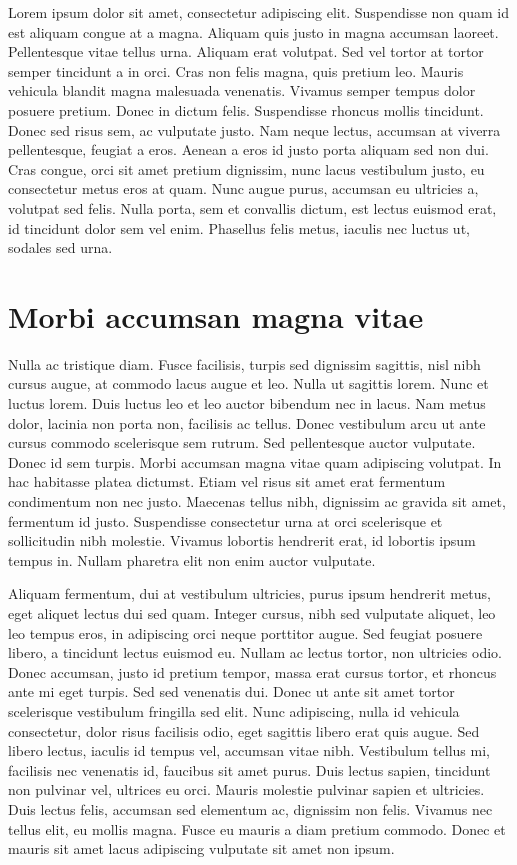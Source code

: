 \documentclass{EPUProjetDi}
\begin{document}
Lorem ipsum dolor sit amet, consectetur adipiscing elit. Suspendisse non quam id est aliquam congue at a magna. Aliquam quis justo in magna accumsan laoreet. Pellentesque vitae tellus urna. Aliquam erat volutpat. Sed vel tortor at tortor semper tincidunt a in orci. Cras non felis magna, quis pretium leo. Mauris vehicula blandit magna malesuada venenatis. Vivamus semper tempus dolor posuere pretium. Donec in dictum felis. Suspendisse rhoncus mollis tincidunt. Donec sed risus sem, ac vulputate justo. Nam neque lectus, accumsan at viverra pellentesque, feugiat a eros. Aenean a eros id justo porta aliquam sed non dui. Cras congue, orci sit amet pretium dignissim, nunc lacus vestibulum justo, eu consectetur metus eros at quam. Nunc augue purus, accumsan eu ultricies a, volutpat sed felis. Nulla porta, sem et convallis dictum, est lectus euismod erat, id tincidunt dolor sem vel enim. Phasellus felis metus, iaculis nec luctus ut, sodales sed urna.

\section{Morbi accumsan magna vitae}

Nulla ac tristique diam. Fusce facilisis, turpis sed dignissim sagittis, nisl nibh cursus augue, at commodo lacus augue et leo. Nulla ut sagittis lorem. Nunc et luctus lorem. Duis luctus leo et leo auctor bibendum nec in lacus. Nam metus dolor, lacinia non porta non, facilisis ac tellus. Donec vestibulum arcu ut ante cursus commodo scelerisque sem rutrum. Sed pellentesque auctor vulputate. Donec id sem turpis. Morbi accumsan magna vitae quam adipiscing volutpat. In hac habitasse platea dictumst. Etiam vel risus sit amet erat fermentum condimentum non nec justo. Maecenas tellus nibh, dignissim ac gravida sit amet, fermentum id justo. Suspendisse consectetur urna at orci scelerisque et sollicitudin nibh molestie. Vivamus lobortis hendrerit erat, id lobortis ipsum tempus in. Nullam pharetra elit non enim auctor vulputate.

Aliquam fermentum, dui at vestibulum ultricies, purus ipsum hendrerit metus, eget aliquet lectus dui sed quam. Integer cursus, nibh sed vulputate aliquet, leo leo tempus eros, in adipiscing orci neque porttitor augue. Sed feugiat posuere libero, a tincidunt lectus euismod eu. Nullam ac lectus tortor, non ultricies odio. Donec accumsan, justo id pretium tempor, massa erat cursus tortor, et rhoncus ante mi eget turpis. Sed sed venenatis dui. Donec ut ante sit amet tortor scelerisque vestibulum fringilla sed elit. Nunc adipiscing, nulla id vehicula consectetur, dolor risus facilisis odio, eget sagittis libero erat quis augue. Sed libero lectus, iaculis id tempus vel, accumsan vitae nibh. Vestibulum tellus mi, facilisis nec venenatis id, faucibus sit amet purus. Duis lectus sapien, tincidunt non pulvinar vel, ultrices eu orci. Mauris molestie pulvinar sapien et ultricies. Duis lectus felis, accumsan sed elementum ac, dignissim non felis. Vivamus nec tellus elit, eu mollis magna. Fusce eu mauris a diam pretium commodo. Donec et mauris sit amet lacus adipiscing vulputate sit amet non ipsum.
\end{document}
